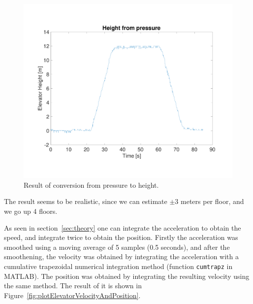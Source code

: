 \documentclass[DIV=14]{scrartcl}
\begin{document}
    \begin{figure}[!h]
        \centering
        \includegraphics[width=.6\textwidth]{plots/plotElevatorPressureHeight}
        \caption{Result of conversion from pressure to height.}
        \label{fig:plotElevatorPressureHeight}
    \end{figure}

    The result seems to be realistic, since we can estimate $\pm3$ meters per floor, and we go up 4 floors.

    As seen in section~\ref{sec:theory} one can integrate the acceleration to obtain the speed, and integrate twice to
    obtain the position.
    Firstly the acceleration was smoothed using a moving average of 5 samples (0.5 seconds), and after the smoothening,
    the velocity was obtained by integrating the acceleration with a cumulative trapezoidal numerical
    integration method (function \texttt{cumtrapz} in MATLAB).
    The position was obtained by integrating the resulting velocity using the same method.
    The result of it is shown in Figure~\ref{fig:plotElevatorVelocityAndPosition}.
\end{document}
